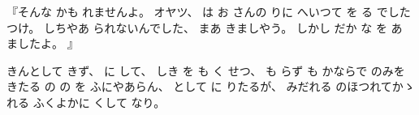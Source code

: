 %
『そんな
かも
れませんよ。
%
オヤツ、
%
は
お
さんの
りに
へいつて%
を
る
でしたつけ。
%
しちやあ
られないんでした、
%
まあ
きましやう。
%
しかし
だか
な
を
あ
ましたよ。
』

%
きんとして
きず、
%
に
して、
%
しき
を
も
く
せつ、
%
も
らず
も
かならで
のみを
きたる
の
の
を
ふにやあらん、
%
として
に
りたるが、
%
みだれる
のほつれてかゝれる
ふくよかに
くして
なり。%
